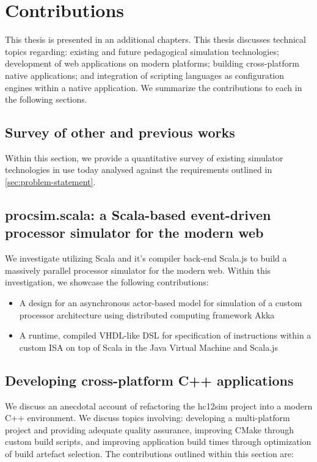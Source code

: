 \section{Contributions}

This thesis is presented in an additional  chapters. This thesis discusses technical topics regarding: existing and future pedagogical simulation technologies; development of web applications on modern platforms; building cross-platform native applications; and integration of scripting languages as configuration engines within a native application. We summarize the contributions to each in the following sections.

\subsection{Survey of other and previous works}

Within this section, we provide a quantitative survey of existing simulator technologies in use today analysed against the requirements outlined in \cref{sec:problem-statement}.

\subsection{procsim.scala: a Scala-based event-driven processor simulator for the modern web}

We investigate utilizing Scala and it's compiler back-end Scala.js to build a massively parallel processor simulator for the modern web. Within this investigation, we showcase the following contributions: 

\begin{itemize}
    \item A design for an asynchronous actor-based model for simulation of a custom processor architecture using distributed computing framework Akka
    \item A runtime, compiled VHDL-like DSL for specification of instructions within a custom ISA on top of Scala in the Java Virtual Machine and Scala.js
\end{itemize}

\subsection{Developing cross-platform C++ applications}

We discuss an anecdotal account of refactoring the hc12sim project into a modern C++ environment. We discuss topics involving: developing a multi-platform project and providing adequate quality assurance, improving CMake through custom build scripts, and improving application build times through optimization of build artefact selection. The contributions outlined within this section are: 


